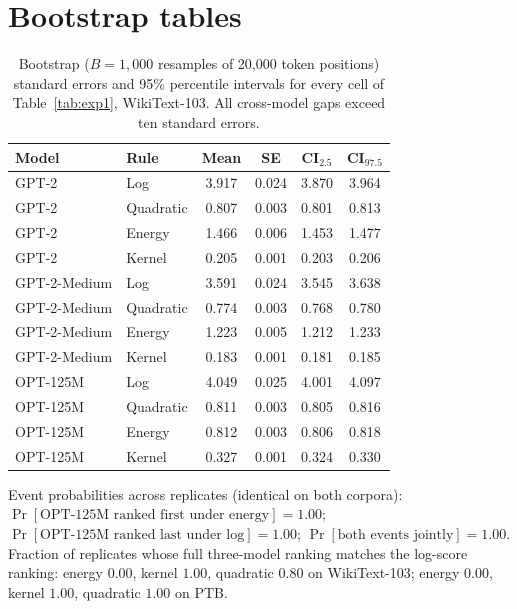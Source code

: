 \documentclass{article}
\begin{document}
\section{Bootstrap tables}
\label{app:boot}

\begin{table}[H]
  \caption{Bootstrap ($B = 1{,}000$ resamples of 20{,}000 token positions) standard
  errors and 95\% percentile intervals for every cell of Table~\ref{tab:exp1},
  WikiText-103. All cross-model gaps exceed ten standard errors.}
  \label{tab:bootci}
  \centering
  \small
  \begin{tabular}{llcccc}
    \toprule
    Model & Rule & Mean & SE & CI$_{2.5}$ & CI$_{97.5}$ \\
    \midrule
    GPT-2        & Log       & 3.917 & 0.024 & 3.870 & 3.964 \\
    GPT-2        & Quadratic & 0.807 & 0.003 & 0.801 & 0.813 \\
    GPT-2        & Energy    & 1.466 & 0.006 & 1.453 & 1.477 \\
    GPT-2        & Kernel    & 0.205 & 0.001 & 0.203 & 0.206 \\
    GPT-2-Medium & Log       & 3.591 & 0.024 & 3.545 & 3.638 \\
    GPT-2-Medium & Quadratic & 0.774 & 0.003 & 0.768 & 0.780 \\
    GPT-2-Medium & Energy    & 1.223 & 0.005 & 1.212 & 1.233 \\
    GPT-2-Medium & Kernel    & 0.183 & 0.001 & 0.181 & 0.185 \\
    OPT-125M     & Log       & 4.049 & 0.025 & 4.001 & 4.097 \\
    OPT-125M     & Quadratic & 0.811 & 0.003 & 0.805 & 0.816 \\
    OPT-125M     & Energy    & 0.812 & 0.003 & 0.806 & 0.818 \\
    OPT-125M     & Kernel    & 0.327 & 0.001 & 0.324 & 0.330 \\
    \bottomrule
  \end{tabular}
\end{table}

Event probabilities across replicates (identical on both corpora):
$\Pr[\text{OPT-125M ranked first under energy}] = 1.00$;
$\Pr[\text{OPT-125M ranked last under log}] = 1.00$;
$\Pr[\text{both events jointly}] = 1.00$.
Fraction of replicates whose full three-model ranking matches the log-score ranking:
energy $0.00$, kernel $1.00$, quadratic $0.80$ on WikiText-103;
energy $0.00$, kernel $1.00$, quadratic $1.00$ on PTB.
\end{document}
